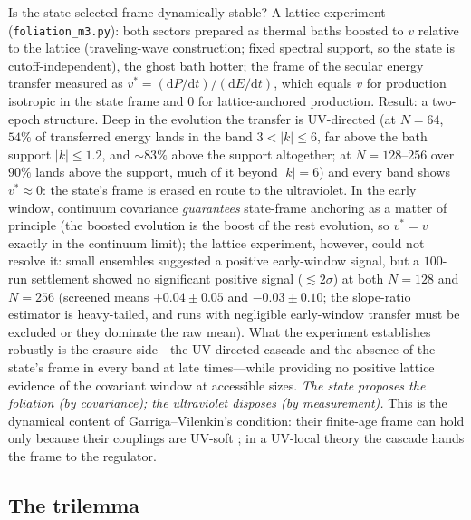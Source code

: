 \documentclass[11pt]{article}
\theoremstyle{definition}
\theoremstyle{remark}
\newcommand{\dd}{\mathrm{d}}
\begin{document}
Is the state-selected frame dynamically stable? A lattice experiment
(\texttt{foliation\_m3.py}): both sectors prepared as thermal baths
boosted to $v$ relative to the lattice (traveling-wave construction;
fixed spectral support, so the state is cutoff-independent), the
ghost bath hotter; the frame of the secular energy transfer measured
as $v^{*}=(\dd P/\dd t)/(\dd E/\dd t)$, which equals $v$ for
production isotropic in the state frame and $0$ for
lattice-anchored production. Result: a two-epoch structure. Deep in
the evolution the transfer is UV-directed (at $N{=}64$, $54\%$ of transferred
energy lands in the band $3<|k|\le6$, far above the bath support
$|k|\le1.2$, and ${\sim}83\%$ above the support altogether; at $N{=}128$--$256$
over $90\%$ lands above the support, much of it beyond $|k|{=}6$) and every band shows
$v^{*}\approx0$: the state's frame is erased en route to the
ultraviolet. In the early window, continuum covariance
\emph{guarantees} state-frame anchoring as a matter of principle
(the boosted evolution is the boost of the rest evolution, so
$v^{*}=v$ exactly in the continuum limit); the lattice experiment,
however, could not resolve it: small ensembles suggested a positive
early-window signal, but a $100$-run settlement showed no significant
positive signal ($\lesssim2\sigma$) at both $N{=}128$ and $N{=}256$ (screened means
$+0.04\pm0.05$ and $-0.03\pm0.10$; the slope-ratio estimator is
heavy-tailed, and runs with negligible early-window transfer must be
excluded or they dominate the raw mean). What the experiment establishes robustly is the
erasure side---the UV-directed cascade and the absence of the
state's frame in every band at late times---while providing no
positive lattice evidence of the covariant window at accessible
sizes.
\emph{The state proposes the foliation (by covariance); the
ultraviolet disposes (by measurement).}
This is the dynamical content of Garriga--Vilenkin's condition: their
finite-age frame can hold only because their couplings are UV-soft
\cite{GV2013}; in a UV-local theory the cascade hands the frame to
the regulator.

\subsection{The trilemma}
\label{sec:trilemma}
\end{document}
